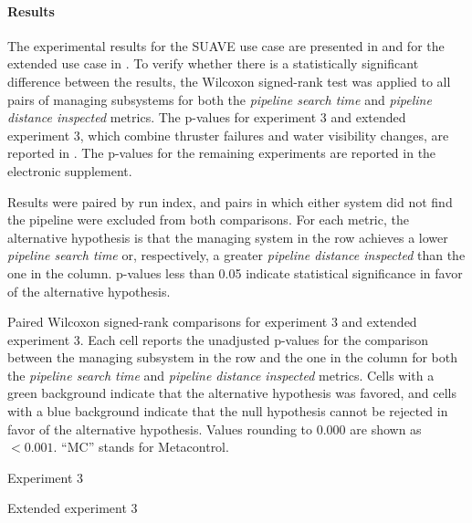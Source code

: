 \paragraph{Results}
The experimental results for the SUAVE use case are presented in  and for the extended use case in . To verify whether there is a statistically significant difference between the results, the Wilcoxon signed-rank test was applied to all pairs of managing subsystems for both the \emph{pipeline search time} and \emph{pipeline distance inspected} metrics. The p-values for experiment 3 and extended experiment 3, which combine thruster failures and water visibility changes, are reported in . The p-values for the remaining experiments are reported in the electronic supplement.

Results were paired by run index, and pairs in which either system did not find the pipeline were excluded from both comparisons. For each metric, the alternative hypothesis is that the managing system in the row achieves a lower \emph{pipeline search time} or, respectively, a greater \emph{pipeline distance inspected} than the one in the column.
p-values less than 0.05 indicate statistical significance in favor of the alternative hypothesis.





\begin{table}[tbp]
\centering
\caption{Paired Wilcoxon signed-rank comparisons for experiment 3 and extended experiment 3. Each cell reports the unadjusted p-values for the comparison between the managing subsystem in the row and the one in the column for both the \emph{pipeline search time} and \emph{pipeline distance inspected} metrics. Cells with a green background indicate that the alternative hypothesis was favored, and cells with a blue background indicate that the null hypothesis cannot be rejected in favor of the alternative hypothesis. Values rounding to 0.000 are shown as $<0.001$. ``MC'' stands for Metacontrol.}%
\label{planta:tab:wilcoxon}
\captionsetup[subtable]{justification=centering,position=bottom}%
\begin{subtable}{\textwidth}
\centering
{}
\caption{Experiment 3}\label{planta:tab:wilcoxon-exp3}
\end{subtable}

\medskip
\begin{subtable}{0.78\textwidth}
\centering
{}
\caption{Extended experiment 3}\label{planta:tab:wilcoxon-extended-exp3}
\end{subtable}
\end{table}

